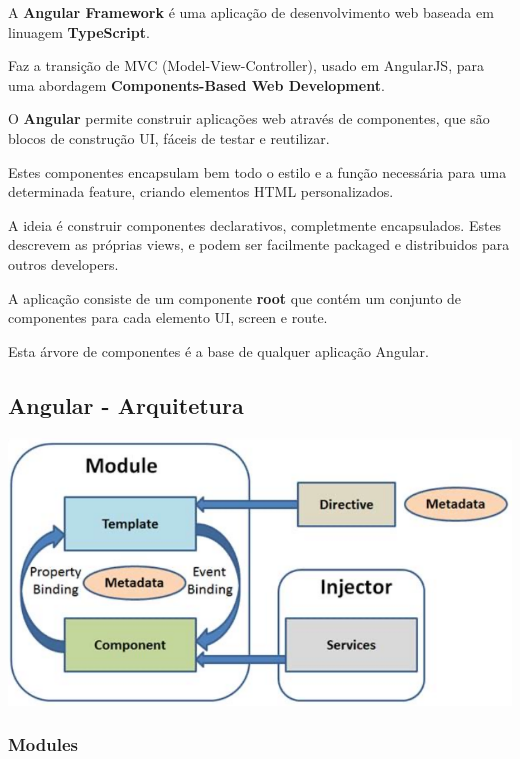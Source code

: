 \documentclass{article}
\begin{document}
A \textbf{Angular Framework} é uma aplicação de desenvolvimento web baseada em
linuagem \textbf{TypeScript}.

Faz a transição de MVC (Model-View-Controller), usado em AngularJS, para uma abordagem
\textbf{Components-Based Web Development}.

O \textbf{Angular} permite construir aplicações web através de componentes,
que são blocos de construção UI, fáceis de testar e reutilizar.

Estes componentes encapsulam bem todo o estilo e a função necessária para uma
determinada feature, criando elementos HTML personalizados.

\vspace{2mm}

A ideia é construir componentes declarativos, completmente encapsulados. Estes descrevem as
próprias views, e podem ser facilmente packaged e distribuidos para outros developers.

A aplicação consiste de um componente \textbf{root} que contém um conjunto de
componentes para cada elemento UI, screen e route.

Esta árvore de componentes é a base de qualquer aplicação Angular.

\pagebreak

\subsection{Angular - Arquitetura}

\begin{center}
  \includegraphics[scale=0.4]{1}
\end{center}

\subsubsection{Modules}
\end{document}
